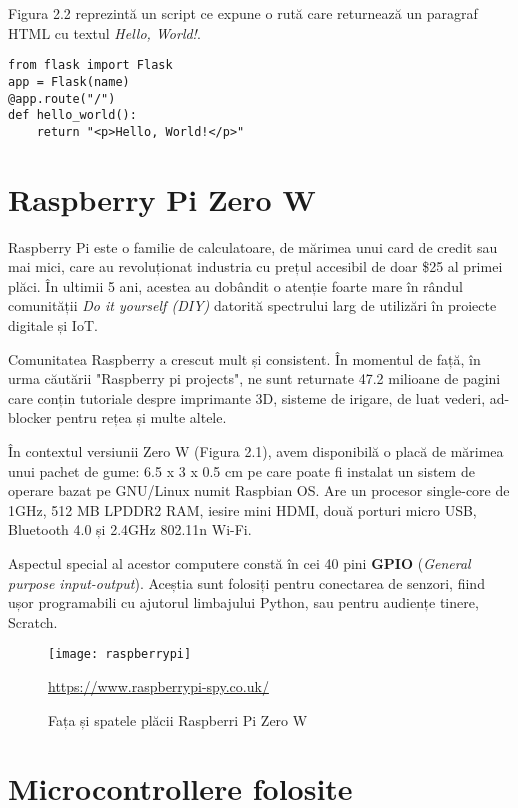Figura 2.2 reprezintă un script ce expune o rută care returnează un paragraf HTML cu textul \emph{Hello, World!}.

\begin{lstlisting}[style=python, caption=Exemplu minimal de aplicație Flask]
from flask import Flask	
app = Flask(name)
@app.route("/")
def hello_world():
	return "<p>Hello, World!</p>"
\end{lstlisting}

\section{Raspberry Pi Zero W}

Raspberry Pi este o familie de calculatoare, de mărimea unui card de credit sau mai mici, care au revoluționat industria cu prețul accesibil de doar \$25 al primei plăci. În ultimii 5 ani, acestea au dobândit o atenție foarte mare în rândul comunității \emph{Do it yourself (DIY)} datorită spectrului larg de utilizări în proiecte digitale și IoT.

Comunitatea Raspberry a crescut mult și consistent. În momentul de față, în urma căutării "Raspberry pi projects", ne sunt returnate 47.2 milioane de pagini care conțin tutoriale despre imprimante 3D, sisteme de irigare, de luat vederi, ad-blocker pentru rețea și multe altele.

În contextul versiunii Zero W (Figura 2.1), avem disponibilă o placă de mărimea unui pachet de gume: 6.5 x 3 x 0.5 cm pe care poate fi instalat un sistem de operare bazat pe GNU/Linux numit Raspbian OS. Are un procesor single-core de 1GHz, 512 MB LPDDR2 RAM, iesire mini HDMI, două porturi micro USB, Bluetooth 4.0 și 2.4GHz 802.11n Wi-Fi.

Aspectul special al acestor computere constă în cei 40 pini \textbf{GPIO} (\emph{General purpose input-output}). Aceștia sunt folosiți pentru conectarea de senzori, fiind ușor programabili cu ajutorul limbajului Python, sau pentru audiențe tinere, Scratch.


\begin{figure}[h]
	\centering
	\texttt{[image: raspberrypi]}
	\caption{Fața și spatele plăcii Raspberri Pi Zero W}\url{https://www.raspberrypi-spy.co.uk/}
	\label{fig:raspberrypi}
\end{figure}

\section{Microcontrollere folosite}

